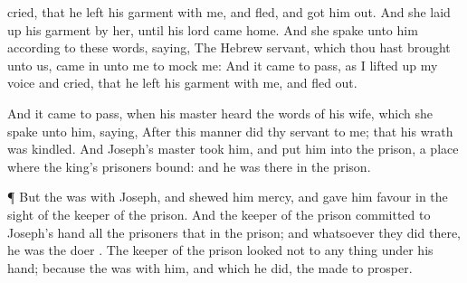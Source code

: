 {cried, that he
left his
garment with
me, and
fled, and got
him
out.
And she laid
up his
garment by
her, until his
lord
came
home.
And she
spake unto him according to these
words,
saying, The
Hebrew
servant, which thou hast
brought unto us, came
in unto me to
mock me:
And it came to pass, as I lifted
up my
voice and
cried, that he
left his
garment with
me, and
fled
out.
\par }{\PP {}And it came to pass, when his
master
heard the
words of his
wife, which she
spake unto him,
saying, After this
manner
did thy
servant to me; that his
wrath was
kindled.
And
Joseph’s
master
took him, and put
him into the
prison, a
place where the
king’s
prisoners
{}
bound: and he was there in the
prison.
\par }{\PP {}¶ But the
{} was with
Joseph, and
shewed him
mercy, and
gave him
favour in the
sight of the
keeper of the
prison.
And the
keeper of the
prison
committed to
Joseph’s
hand all the
prisoners that
{} in the
prison; and whatsoever they
did there, he was the
doer
{}.
The
keeper of the
prison
looked not to any
thing
{} under his
hand; because the
{} was with him, and
{} which he
did, the
{} made
{} to
prosper.

}
